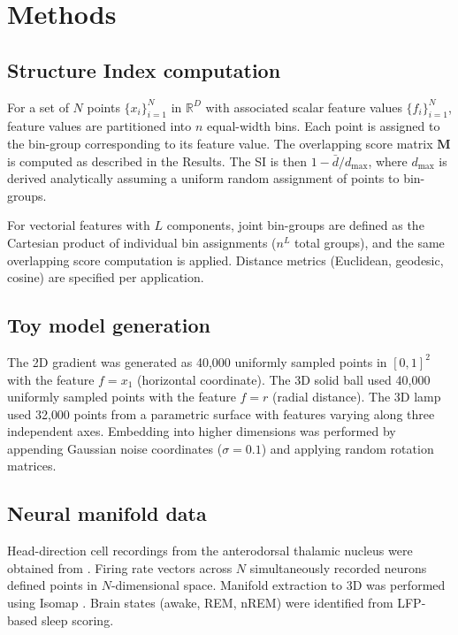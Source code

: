 \documentclass[11pt]{article}
\begin{document}
\section{Methods}

\subsection{Structure Index computation}

For a set of $N$ points $\{x_i\}_{i=1}^N$ in $\mathbb{R}^D$ with associated scalar feature values $\{f_i\}_{i=1}^N$, feature values are partitioned into $n$ equal-width bins. Each point is assigned to the bin-group corresponding to its feature value. The overlapping score matrix $\mathbf{M}$ is computed as described in the Results. The SI is then $1 - \bar{d}/d_{\max}$, where $d_{\max}$ is derived analytically assuming a uniform random assignment of points to bin-groups.

For vectorial features with $L$ components, joint bin-groups are defined as the Cartesian product of individual bin assignments ($n^L$ total groups), and the same overlapping score computation is applied. Distance metrics (Euclidean, geodesic, cosine) are specified per application.

\subsection{Toy model generation}

The 2D gradient was generated as 40{,}000 uniformly sampled points in $[0,1]^2$ with the feature $f = x_1$ (horizontal coordinate). The 3D solid ball used 40{,}000 uniformly sampled points with the feature $f = r$ (radial distance). The 3D lamp used 32{,}000 points from a parametric surface with features varying along three independent axes. Embedding into higher dimensions was performed by appending Gaussian noise coordinates ($\sigma = 0.1$) and applying random rotation matrices.

\subsection{Neural manifold data}

Head-direction cell recordings from the anterodorsal thalamic nucleus were obtained from \citet{peyrache2015internally}. Firing rate vectors across $N$ simultaneously recorded neurons defined points in $N$-dimensional space. Manifold extraction to 3D was performed using Isomap \citep{tenenbaum2000isomap}. Brain states (awake, REM, nREM) were identified from LFP-based sleep scoring.
\end{document}
